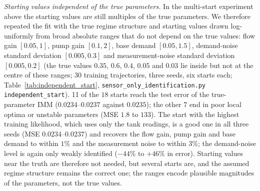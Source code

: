 \documentclass[conference]{IEEEtran}
\begin{document}
\begin{table}[t]
\centering
\caption{Sensor-only identification from broad starts and assumed structures.}
\label{tab:multistart}
\small
\setlength{\tabcolsep}{3pt}
\end{table}

\emph{Starting values independent of the true parameters.} In the multi-start experiment above the starting values are still multiples of the true parameters. We therefore repeated the fit with the true regime structure and starting values drawn log-uniformly from broad absolute ranges that do not depend on the true values: flow gain $[0.05,1]$, pump gain $[0.1,2]$, base demand $[0.05,1.5]$, demand-noise standard deviation $[0.005,0.3]$ and measurement-noise standard deviation $[0.005,0.2]$ (the true values $0.35$, $0.6$, $0.4$, $0.05$ and $0.03$ lie inside but not at the centre of these ranges; $30$ training trajectories, three seeds, six starts each; Table~\ref{tab:independent_start}, \texttt{sensor\_only\_identification.py independent\_start}). 11 of the $18$ starts reach the test error of the true-parameter IMM ($0.0234$--$0.0237$ against $0.0235$); the other $7$ end in poor local optima or unstable parameters (MSE $1.8$ to $133$). The start with the highest training likelihood, which uses only the tank readings, is a good one in all three seeds (MSE $0.0234$--$0.0237$) and recovers the flow gain, pump gain and base demand to within $1\%$ and the measurement noise to within $3\%$; the demand-noise level is again only weakly identified ($-44\%$ to $+46\%$ in error). Starting values near the truth are therefore not needed, but several starts are, and the assumed regime structure remains the correct one; the ranges encode plausible magnitudes of the parameters, not the true values.
\end{document}
